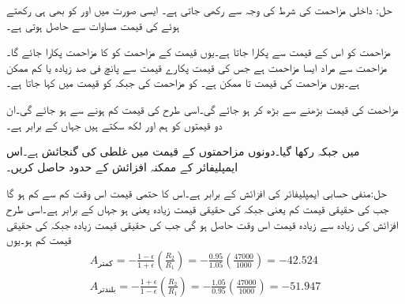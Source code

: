 حل:
داخلی مزاحمت  کی شرط کی وجہ سے  رکھی جاتی ہے۔ ایسی صورت میں  اور  کو بھی  ہی رکھتے ہوئے  کی قیمت مساوات   سے حاصل ہوتی ہے۔  

مزاحمت کو اس کے قیمت سے پکارا جاتا ہے۔یوں  قیمت کے مزاحمت کو  کا مزاحمت پکارا جائے گا۔ مزاحمت سے مراد ایسا مزاحمت ہے جس کی قیمت پکارے قیمت سے  پانچ فی صد زیادہ یا کم ممکن ہے۔یوں 
 مزاحمت کی قیمت  تا  ممکن ہے۔ کو مزاحمت کی  جبکہ   کو قیمت میں  کہا جاتا ہے۔

مزاحمت  کی قیمت  بڑھنے سے  بڑھ کر  ہو جائے گی۔اسی طرح  کی قیمت  کم ہونے سے   ہو جائے گی۔ان دو قیمتوں کو ہم  اور  لکھ سکتے ہیں جہاں  کے برابر ہے۔

 میں  جبکہ  رکھا گیا۔دونوں مزاحمتوں کے قیمت میں  غلطی کی گنجائش ہے۔اس ایمپلیفائر کے ممکنہ افزائش کے حدود حاصل کریں۔

حل:منفی حسابی ایمپلیفائر کی افزائش  کے برابر ہے۔اس کا حتمی قیمت اس وقت کم سے کم  ہو گا جب  کی حقیقی قیمت  کم یعنی  جبکہ  کی حقیقی قیمت  زیادہ  یعنی  ہو جہاں  کے برابر ہے۔اسی طرح افزائش کی زیادہ سے زیادہ قیمت اس وقت حاصل ہو گی جب  کی حقیقی قیمت  زیادہ جبکہ  کی حقیقی قیمت  کم ہو۔یوں
\begin{align*}
A_{\textrm{کمتر}}=-\frac{1-\epsilon}{1+\epsilon} \left(\frac{R_2}{R_1} \right)=-\frac{0.95}{1.05} \left(\frac{47000}{1000}\right)=-42.524\\
A_{\textrm{بلندتر}}=-\frac{1+\epsilon}{1-\epsilon} \left(\frac{R_2}{R_1} \right)=-\frac{1.05}{0.95} \left(\frac{47000}{1000}\right)=-51.947
\end{align*}

